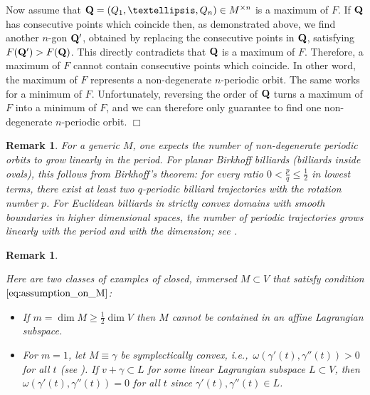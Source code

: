 \documentclass[12pt]{article}
\newtheorem{remark}[lemma]{Remark}
\newcommand{\proofend}{$\Box$\bigskip}
\newcommand{\R}{{\mathbb R}}
\begin{document}
Now assume that ${\bf Q}=(Q_1,\ldots, Q_{n})\in M^{\times n}$ is a maximum of $F$. 
If ${\bf Q}$ has consecutive points which coincide then, as demonstrated above, we find another $n$-gon ${\bf Q}'$, obtained by replacing the consecutive points in ${\bf Q}$, satisfying $F({\bf Q}')> F({\bf Q})$. This directly contradicts that ${\bf Q}$ is a maximum of $F$. Therefore, a maximum of $F$ cannot contain consecutive points which coincide. In other word, the maximum of $F$ represents a non-degenerate $n$-periodic orbit. The same works for a minimum of $F$. Unfortunately, reversing the order of ${\bf Q}$ turns a maximum of $F$ into a minimum of $F$, and we can therefore only guarantee to find one non-degenerate $n$-periodic orbit.
\proofend

\begin{remark} \label{rmk:growth}
{\rm For a generic $M$, one expects the number of non-degenerate periodic orbits to grow linearly in the period. For planar Birkhoff billiards (billiards inside ovals), this follows from Birkhoff's theorem: for every ratio $0<\frac{p}{q}\leq\frac12$ in lowest terms, there exist at least two $q$-periodic billiard trajectories with the rotation number $p$. 
For Euclidean billiards in strictly convex domains with smooth boundaries in higher dimensional spaces, the number of periodic trajectories grows linearly with the period and with the dimension; see
 \cite{FT1}. %
}
\end{remark}

\begin{remark} \label{rmk:L}
{\rm
Here are two classes of examples of closed, immersed $M\subset V$ that satisfy condition $\eqref{eq:assumption_on_M}$:

\begin{itemize}
\item If $m=\dim M\geq \tfrac12\dim V$ then $M$ cannot be contained in an affine Lagrangian subspace.
\item For $m=1$, let $M\equiv \gamma$ be symplectically convex, i.e.,~$\omega(\gamma'(t),\gamma''(t))>0$ for all $t$ (see \cite{AT}). If $v+\gamma\subset L$ for some linear Lagrangian subspace $L\subset V$, then $\omega(\gamma'(t),\gamma''(t))=0$ for all $t$ since $\gamma'(t), \gamma''(t) \in L$.
\end{itemize}
}
\end{remark}
\end{document}
